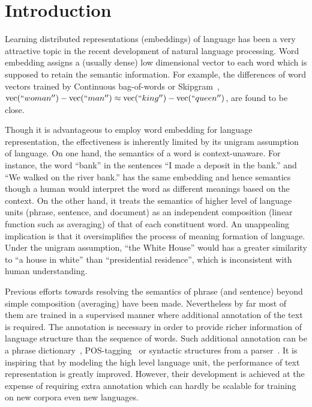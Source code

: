 \section{Introduction}

Learning distributed representations (embeddings) of language has been a very
attractive topic in the recent development of natural language processing. Word
embedding assigns a (usually dense) low dimensional vector to each word which is
supposed to retain the semantic information. For example, the differences of
word vectors trained by Continuous bag-of-words or
Skipgram~\cite{mikolov2013distributed}, $\text{vec}(``woman'') -
\text{vec}(``man'') \approx \text{vec}(``king'') - \text{vec}(``queen'')$, are
found to be close.

Though it is advantageous to employ word embedding for language representation,
the effectiveness is inherently limited by its unigram assumption of language.
On one hand, the semantics of a word is context-unaware. For instance, the word
``bank'' in the sentences ``I made a deposit in the bank.'' and ``We walked on
the river bank.'' has the same embedding and hence semantics though a human
would interpret the word as different meanings based on the context. On the
other hand, it treats the semantics of higher level of language units (phrase,
sentence, and document) as an independent composition (linear function such as
averaging) of that of each constituent word. An unappealing implication is that
it oversimplifies the process of meaning formation of language. Under the
unigram assumption, ``the White House'' would has a greater similarity to ``a
house in white'' than ``presidential residence'', which is inconsistent with
human understanding.

Previous efforts towards resolving the semantics of phrase (and sentence) beyond
simple composition (averaging) have been made. Nevertheless by far most of them
are trained in a supervised manner where additional annotation of the text is
required. The annotation is necessary in order to provide richer information of
language structure than the sequence of words. Such additional annotation can be
a phrase dictionary~\cite{yin2014exploration},
POS-tagging~\cite{zhao2015phrase,baroni2010nouns} or syntactic structures from a
parser~\cite{levy2014dependency,yu2015learning,socher2013parsing,
le2015compositional,irsoy2014deep}. It is inspiring that by modeling the high
level language unit, the performance of text representation is greatly improved.
However, their development is achieved at the expense of requiring extra
annotation which can hardly be scalable for training on new corpora even new
languages.

